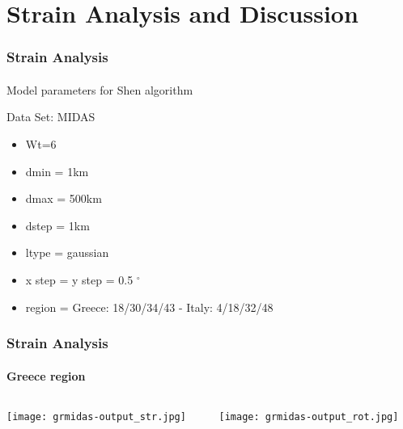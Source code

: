 \section{Strain Analysis and Discussion}
 
\graphicspath{{Chapter4/Figs/}}

\begin{frame}
 \frametitle{Strain Analysis}
 \framesubtitle{}
 \label{ch4:}
 
  Model parameters for Shen algorithm
  
  Data Set: MIDAS
  \begin{itemize}
    \item Wt=6
    \item dmin = 1km
    \item dmax = 500km
    \item dstep = 1km
    \item ltype = gaussian
    \item x step = y step = 0.5 $^{\circ}$
    \item region = Greece: 18/30/34/43 -  Italy: 4/18/32/48
  \end{itemize}

\end{frame}
\note{}

\begin{frame}
 \frametitle{Strain Analysis}
 \framesubtitle{Greece region}
 \label{ch4:}
   
  \begin{columns}
    \begin{column}{0.5\textwidth}
      
      \texttt{[image: grmidas-output\_str.jpg]}   
    \end{column}
    \begin{column}{0.5\textwidth}
    \begin{center}
      
      \texttt{[image: grmidas-output\_rot.jpg]}     
    \end{center}
    \end{column}
  \end{columns}

\end{frame}
\note{}

